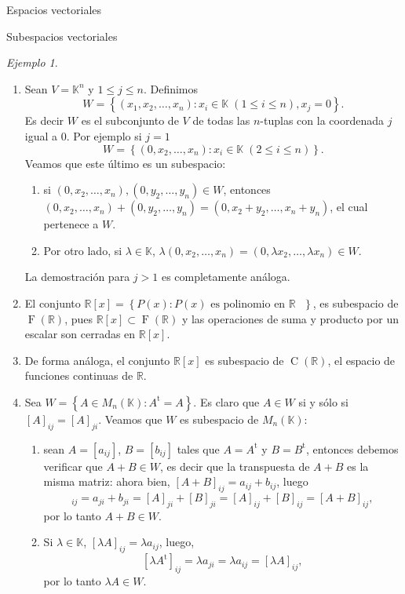 \documentclass[a4paper,12pt,twoside,spanish,reqno]{amsbook}
\numberwithin{equation}{section}
\theoremstyle{definition}
\theoremstyle{remark}
\newtheorem*{ejemplo*}{Ejemplo}
\renewcommand{\t}{{\operatorname{t}}}
\newcommand{\R}{\mathbb R}
\newcommand{\K}{\mathbb K}
\begin{document}
\begin{chapter}{Espacios vectoriales}
\begin{section}{Subespacios vectoriales}
\begin{ejemplo*}
\begin{enumerate}
        
        \item Sean $V=\K^n$ y $1\le j \le n$. Definimos 
        $$
        W = \left\{ (x_1,x_2,\ldots,x_n): x_i \in \K\; (1 \le i \le n), x_j =0\right\}.
        $$
        Es decir $W$  es el subconjunto de $V$ de todas las $n$-tuplas con la coordenada $j$ igual a 0. Por ejemplo  si $j=1$ 
        $$
        W = \left\{ (0,x_2,\ldots,x_n): x_i \in \K \;(2 \le i \le n)\right\}.
        $$
        Veamos que este último es un subespacio: 
        \begin{enumerate}
            \item si $(0,x_2,\ldots,x_n), (0,y_2,\ldots,y_n) \in W$,  entonces
            $(0,x_2,\ldots,x_n)+ (0,y_2,\ldots,y_n) = (0,x_2+y_2,\ldots,x_n+y_n)$, el cual pertenece a $W$. 
            \item 	Por otro lado, si $\lambda \in \K$, $\lambda(0,x_2,\ldots,x_n) = (0,\lambda x_2,\ldots,\lambda x_n) \in W$.
        \end{enumerate}
        La demostración para $j >1$ es completamente análoga. 
        \item El  conjunto $\R[x] = \left\{P(x): P(x) \text{ es polinomio en $\R$ } \right\}$, es subespacio de $\operatorname{F}(\R)$, pues $\R[x] \subset \operatorname{F}(\R)$ y las operaciones de suma y producto por un escalar son cerradas en $\R[x]$.
        \item De forma análoga, el conjunto $\R[x]$ es subespacio de $\operatorname{C}(\R)$,  el espacio de funciones continuas de  $\R$.
        \item Sea $W= \left\{A \in M_n(\K): A^\t = A \right\}$. Es claro que  $A \in W$ si y sólo si $[A]_{ij} = [A]_{ji}$. Veamos que  $W$ es subespacio de $M_n(\K)$: 
        \begin{enumerate}
            \item sean $A=[a_{ij}]$, $B= [b_{ij}]$ tales que $A=A^\t$ y $B=B^\t$, entonces debemos verificar que $A+ B \in W$,  es decir que la transpuesta de $A+B$  es la misma matriz: ahora bien, $[A+B]_{ij} = a_{ij}+b_{ij}$, luego 
            \begin{equation*}
                [(A+B)^\t]_{ij} =a_{ji}+b_{ji} = [A]_{ji} + [B]_{ji} = [A]_{ij} + [B]_{ij} = [A+B]_{ij},
            \end{equation*}
            por lo tanto $A+B \in W$.
            \item Si $\lambda \in \K$, $[\lambda A]_{ij} = \lambda a_{ij}$, luego, 
            $$
            [\lambda A^\t]_{ij} = \lambda a_{ji} = \lambda a_{ij} = [\lambda A]_{ij},
            $$
            por lo tanto $\lambda A \in W$.
        \end{enumerate} 	


\end{enumerate}
\end{ejemplo*}
\end{section}
\end{chapter}
\end{document}
